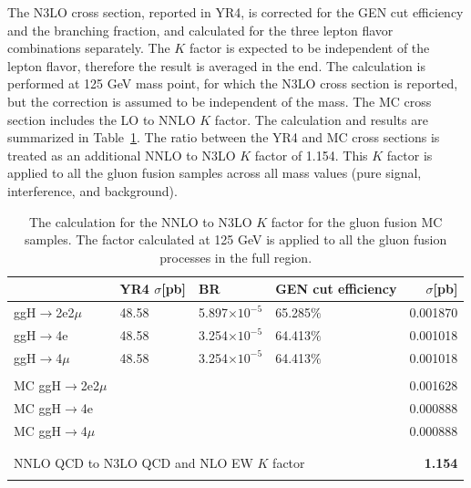 The N3LO cross section, reported in YR4, is corrected for the GEN cut efficiency and the \Hboson branching fraction,
and calculated for the three lepton flavor combinations separately. The $K$ factor is expected to be independent of
the lepton flavor, therefore the result is averaged in the end. The calculation is performed at 125 GeV mass point,
for which the N3LO cross section is reported, but the correction is assumed to be independent of the mass. 
The MC cross section includes the LO to NNLO $K$ factor. The calculation and results are summarized in Table~\ref{tab:ggH_YR4}. 
The ratio between the YR4 and MC cross sections is treated as an additional NNLO to N3LO $K$ factor of 1.154.
This $K$ factor is applied to all the gluon fusion samples across all mass values (pure signal, interference, and background).

\begin{table}[!hbt]
\begin{center}
\small
\begin{tabular}{llllr}
\hline
              & YR4 $\sigma$[pb] & BR   & GEN cut efficiency  &  $\sigma$[pb]     \\
\hline
ggH$\rightarrow$2e2$\mu$ & 48.58  & 5.897$\times10^{-5}$   & 65.285$\%$    & 0.001870    \\
ggH$\rightarrow$4e     & 48.58 & 3.254$\times10^{-5}$  & 64.413$\%$   & 0.001018    \\
ggH$\rightarrow$4$\mu$   & 48.58 & 3.254$\times10^{-5}$   & 64.413$\%$    & 0.001018    \\
\vspace{-0.2cm} \\
MC ggH$\rightarrow$2e2$\mu$ &   & &  & 0.001628    \\
MC ggH$\rightarrow$4e    &   & &  & 0.000888   \\
MC ggH$\rightarrow$4$\mu$  &   & &  & 0.000888 \\
\vspace{-0.2cm} \\
\hline
\vspace{-0.2cm} \\

\multicolumn{4}{l}{NNLO QCD to N3LO QCD and NLO EW $K$ factor} &   \textbf{1.154} \\   %
\vspace{-0.2cm} \\
\hline
\end{tabular}
\caption{The calculation for the NNLO to N3LO $K$ factor for the gluon fusion MC samples. 
The factor calculated at 125 GeV is applied to all the gluon fusion processes in the full \offshell region.}
\label{tab:ggH_YR4}
\end{center}
\end{table}

